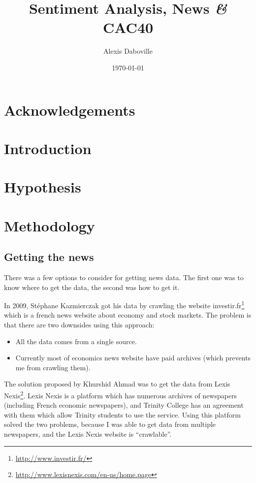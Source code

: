 \documentclass[12pt,a4wide]{report}
\newcommand{\amp}{{\fontfamily{ppl}\selectfont\emph\&}}
\begin{document}
	\title{Sentiment Analysis, News \amp{} CAC40}
	\date{\today}
	\author{Alexis Daboville}
	
	\maketitle
	
	\pagestyle{headings}
	\tableofcontents
	
	\chapter{Acknowledgements}
	
	\chapter{Introduction}
	
	\chapter{Hypothesis}
	
	\chapter{Methodology}
		\section{Getting the news}
		
			There was a few options to consider for getting news data. The first one was to know where to get the data, the second was how to get it.
			
			In 2009, Stéphane Kazmierczak got his data by crawling the website investir.fr\footnote{\url{http://www.investir.fr/}} which is a french news website about economy and stock markets. The problem is that there are two downsides using this approach:
			\begin{itemize}
				\item All the data comes from a single source.
				\item Currently most of economics news website have paid archives (which prevents me from crawling them).
			\end{itemize}
			
			The solution proposed by Khurshid Ahmad was to get the data from Lexis Nexis\footnote{\url{http://www.lexisnexis.com/en-us/home.page}}. Lexis Nexis is a platform which has numerous archives of newspapers (including French economic newspapers), and Trinity College has an agreement with them which allow Trinity students to use the service. Using this platform solved the two problems, because I was able to get data from multiple newspapers, and the Lexis Nexis website is ``crawlable''.
			
\end{document}
